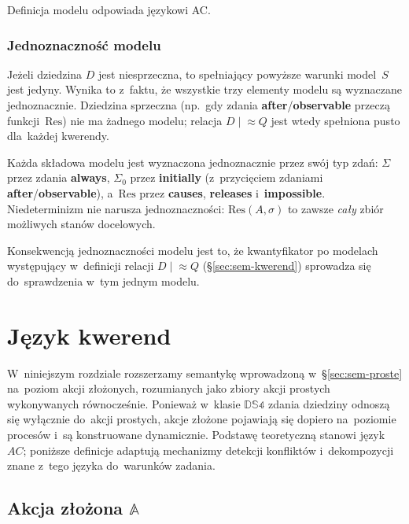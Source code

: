 \documentclass[11pt,a4paper]{article}
\newif\ifshowbib
\newcommand{\bibonly}[1]{\ifshowbib#1\fi}
\renewcommand{\cite}[2][]{\unskip}%
\theoremstyle{definition}
\begin{document}
Definicja modelu odpowiada językowi AC\bibonly{~\cite{rw05}}.

\subsubsection{Jednoznaczność modelu}
\label{sec:jednoznacznosc-modelu}

Jeżeli dziedzina $D$ jest niesprzeczna, to spełniający powyższe warunki model~$S$ jest jedyny. Wynika to z~faktu, że wszystkie trzy elementy modelu są wyznaczane jednoznacznie. Dziedzina sprzeczna (np.\ gdy zdania \textbf{after}/\textbf{observable} przeczą funkcji~$\mathrm{Res}$) nie ma żadnego modelu; relacja $D \mid\!\approx Q$ jest wtedy spełniona pusto dla~każdej kwerendy.

Każda składowa modelu jest wyznaczona jednoznacznie przez swój typ zdań: $\Sigma$ przez zdania \textbf{always}, $\Sigma_0$ przez \textbf{initially} (z~przycięciem zdaniami \textbf{after}/\textbf{observable}), a~$\mathrm{Res}$ przez \textbf{causes}, \textbf{releases} i~\textbf{impossible}. Niedeterminizm nie narusza jednoznaczności: $\mathrm{Res}(A,\sigma)$ to zawsze \emph{cały} zbiór możliwych stanów docelowych.

Konsekwencją jednoznaczności modelu jest to, że kwantyfikator po modelach występujący w~definicji relacji $D \mid\!\approx Q$ (\S\ref{sec:sem-kwerend}) sprowadza się do~sprawdzenia w~tym jednym modelu.

\section{Język kwerend}
\label{sec:jezyk-kwerend}

W~niniejszym rozdziale rozszerzamy semantykę wprowadzoną w~\S\ref{sec:sem-proste} na~poziom
akcji złożonych, rozumianych jako zbiory akcji prostych wykonywanych
równocześnie. Ponieważ w~klasie $\mathbb{DS4}$ zdania dziedziny
odnoszą się wyłącznie do~akcji prostych, akcje złożone pojawiają się
dopiero na~poziomie procesów i~są konstruowane dynamicznie. Podstawę
teoretyczną stanowi język~$AC$\bibonly{~\cite{rw05}}; poniższe definicje
adaptują mechanizmy detekcji konfliktów i~dekompozycji znane z~tego języka
do~warunków zadania.

\subsection{Akcja złożona \texorpdfstring{$\mathbb{A}$}{A}}
\label{sec:akcja-zlozona}
\end{document}
